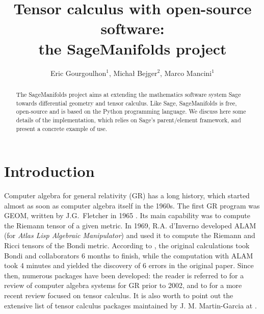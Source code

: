 \documentclass[a4paper]{jpconf}
\newcommand{\soft}[1]{\textsf{#1}}
\newcommand{\Sage}{\soft{Sage}}
\newcommand{\SM}{\soft{SageManifolds}}
\begin{document}
\title{Tensor calculus with open-source software: \\
the SageManifolds project}

\author{Eric Gourgoulhon$^1$, Micha\l{} Bejger$^2$, Marco Mancini$^1$}

\address{$^1$ Laboratoire Univers et Th\'eories, UMR 8102 du 
CNRS, Observatoire de Paris, Universit\'e Paris Diderot,
92190 Meudon, France}

\address{$^2$ Centrum Astronomiczne im. M. Kopernika, ul. Bartycka 18,
00-716 Warsaw, Poland}


\begin{abstract}
The \SM{} project aims at extending the mathematics software system \Sage{} towards
differential geometry and tensor calculus. Like \Sage{}, \SM{} is free,
open-source and is based on the Python programming language.
We discuss here some details of the implementation, which relies 
on \Sage{}'s parent/element framework, and present a concrete example of use.
\end{abstract}


\section{Introduction}

Computer algebra for general relativity (GR) has a long history, which started
almost as soon as computer algebra itself in the 1960s. 
The first GR program was \soft{GEOM}, written by J.G.~Fletcher
in 1965 \cite{Fletc67}. Its main capability was to compute the Riemann tensor
of a given metric. In 1969, R.A. d'Inverno developed \soft{ALAM}
(for \emph{Atlas Lisp Algebraic Manipulator}) and used it to compute
the Riemann and Ricci tensors of the Bondi metric.
According to \cite{Skea94}, 
the original calculations took Bondi and collaborators 6 months to finish,
while the computation with \soft{ALAM} took 4 minutes and yielded the 
discovery of 6 errors in the original paper. 
Since then, numerous packages have been developed: the reader is referred to \cite{MacCa02}
for a review of computer algebra
systems for GR prior to 2002, and to \cite{KorolKS13} for a more recent review 
focused on tensor calculus. 
It is also worth to point out the extensive list of
tensor calculus packages maintained by J. M. Martin-Garcia at \cite{xact_links}.
\end{document}
